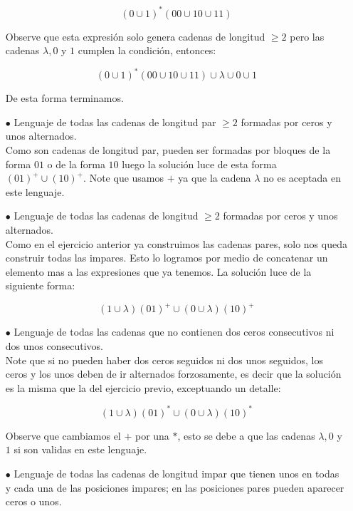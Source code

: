 \begin{itemize}
    $$(0\cup1)^*(00\cup10\cup11)$$

    Observe que esta expresión solo genera cadenas de longitud $\geq2$ pero las cadenas $\lambda,0$ y $1$ cumplen la condición, entonces:

    $$(0\cup1)^*(00\cup10\cup11)\cup\lambda\cup0\cup1$$

    De esta forma terminamos.

    \item[$\bullet$] Lenguaje de todas las cadenas de longitud par $\geq2$ formadas por ceros y unos alternados.\\ 

    Como son cadenas de longitud par, pueden ser formadas por bloques de la forma $01$ o de la forma $10$ luego la solución luce de esta forma $(01)^+\cup(10)^+$. Note que usamos $+$ ya que la cadena $\lambda$ no es aceptada en este lenguaje.

    \item[$\bullet$] Lenguaje de todas las cadenas de longitud $\geq2$ formadas por ceros y unos alternados.\\ 

    Como en el ejercicio anterior ya construimos las cadenas pares, solo nos queda construir todas las impares. Esto lo logramos por medio de concatenar un elemento mas a las expresiones que ya tenemos. La solución luce de la siguiente forma:

    $$(1\cup\lambda)(01)^+\cup(0\cup\lambda)(10)^+$$

    \item[$\bullet$] Lenguaje de todas las cadenas que no contienen dos ceros consecutivos ni dos unos consecutivos.\\ 

    Note que si no pueden haber dos ceros seguidos ni dos unos seguidos, los ceros y los unos deben de ir alternados forzosamente, es decir que la solución es la misma que la del ejercicio previo, exceptuando un detalle:

     $$(1\cup\lambda)(01)^*\cup(0\cup\lambda)(10)^*$$

     Observe que cambiamos el $+$ por una $*$, esto se debe a que las cadenas $\lambda,0$ y $1$ si son validas en este lenguaje.

     \item[$\bullet$] Lenguaje de todas las cadenas de longitud impar que tienen unos en todas y cada una de las posiciones impares; en las posiciones pares pueden aparecer ceros o unos.\\


\end{itemize}
